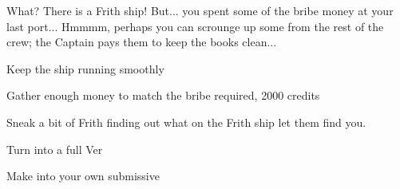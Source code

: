 \documentclass[char]{guildcamp4}
\begin{document}
What? There is a Frith ship! But... you spent some of the bribe money at your last port... Hmmmm, perhaps you can scrounge up some from the rest of the crew; the Captain pays them to keep the books clean...

\begin{itemz}[Goals]
	\item Keep the ship running smoothly
	\item Gather enough money to match the bribe required, 2000 credits
	\item Sneak a bit of Frith finding out what on the Frith ship let them find you.
	\item Turn \cJulie{} into a full Ver
	\item Make \cJulie{} into your own submissive
\end{itemz}

\begin{contacts}
	\contact{\cVone{}} 
	\contact{\cVthree{}}
	\contact{\cJoan{}}
	\contact{\cJulie{}}
	\contact{\cJames{}}
	\contact{\cRasputin{}}
	\contact{\cSpite{}}
	\contact{\cPlead{}}
\end{contacts}
\end{document}
